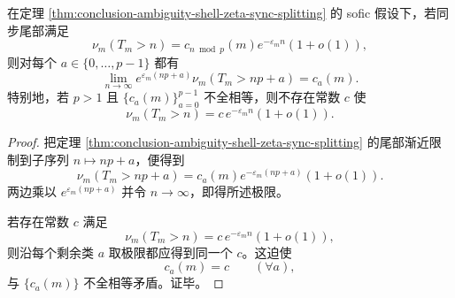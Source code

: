 \begin{corollary}[同步尾部的剩余类极限律]\label{cor:conclusion-sync-tail-residue-class-limit-law}
在定理 \ref{thm:conclusion-ambiguity-shell-zeta-sync-splitting} 的 sofic 假设下，若同步尾部满足
\[
\nu_m(T_m>n)=c_{n\bmod p}(m)e^{-\varepsilon_m n}(1+o(1)),
\]
则对每个 \(a\in\{0,\dots,p-1\}\) 都有
\[
\lim_{n\to\infty}
e^{\varepsilon_m(np+a)}\nu_m(T_m>np+a)
=
c_a(m).
\]
特别地，若 \(p>1\) 且 \(\{c_a(m)\}_{a=0}^{p-1}\) 不全相等，则不存在常数 \(c\) 使
\[
\nu_m(T_m>n)=c\,e^{-\varepsilon_m n}(1+o(1)).
\]
\end{corollary}
\begin{proof}
把定理 \ref{thm:conclusion-ambiguity-shell-zeta-sync-splitting} 的尾部渐近限制到子序列 \(n\mapsto np+a\)，便得到
\[
\nu_m(T_m>np+a)=c_a(m)e^{-\varepsilon_m(np+a)}(1+o(1)).
\]
两边乘以 \(e^{\varepsilon_m(np+a)}\) 并令 \(n\to\infty\)，即得所述极限。

若存在常数 \(c\) 满足
\[
\nu_m(T_m>n)=c\,e^{-\varepsilon_m n}(1+o(1)),
\]
则沿每个剩余类 \(a\) 取极限都应得到同一个 \(c\)。这迫使
\[
c_a(m)=c
\qquad(\forall a),
\]
与 \(\{c_a(m)\}\) 不全相等矛盾。证毕。
\end{proof}
